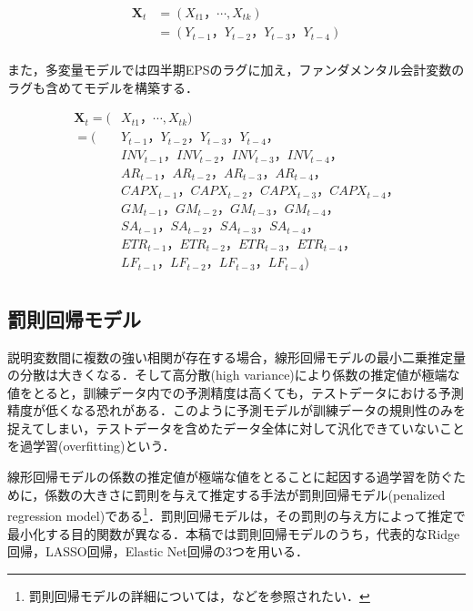 \documentclass[a4paper，12pt]{jsarticle}
\begin{document}
\begin{equation}
  \begin{split}
    \bm{X}_t &= (X_{t1}，\cdots ,X_{tk}) \\
    &= (Y_{t-1}，Y_{t-2}，Y_{t-3}，Y_{t-4}) \\
  \end{split}
\end{equation}

また，多変量モデルでは四半期EPSのラグに加え，ファンダメンタル会計変数のラグも含めてモデルを構築する．

\begin{equation}
  \begin{split}
    \bm{X}_t = (&X_{t1}，\cdots ,X_{tk}) \\ 
    =(&Y_{t-1}，Y_{t-2}，Y_{t-3}，Y_{t-4}，\\
    & INV_{t-1}，INV_{t-2}，INV_{t-3}，INV_{t-4}，\\
    & AR_{t-1}，AR_{t-2}，AR_{t-3}，AR_{t-4}，\\
    & CAPX_{t-1}，CAPX_{t-2}，CAPX_{t-3}，CAPX_{t-4}，\\
    & GM_{t-1}，GM_{t-2}，GM_{t-3}，GM_{t-4}，\\
    & SA_{t-1}，SA_{t-2}，SA_{t-3}，SA_{t-4}，\\
    & ETR_{t-1}，ETR_{t-2}，ETR_{t-3}，ETR_{t-4}，\\ 
    & LF_{t-1}，LF_{t-2}，LF_{t-3}，LF_{t-4}) \\
  \end{split}
\end{equation}

\subsection{罰則回帰モデル}

説明変数間に複数の強い相関が存在する場合，線形回帰モデルの最小二乗推定量の分散は大きくなる．そして高分散(high variance)により係数の推定値が極端な値をとると，訓練データ内での予測精度は高くても，テストデータにおける予測精度が低くなる恐れがある．このように予測モデルが訓練データの規則性のみを捉えてしまい，テストデータを含めたデータ全体に対して汎化できていないことを過学習(overfitting)という．

線形回帰モデルの係数の推定値が極端な値をとることに起因する過学習を防ぐために，係数の大きさに罰則を与えて推定する手法が罰則回帰モデル(penalized regression model)である\footnote{罰則回帰モデルの詳細については，\cite*{hoerl1970ridge, tibshirani1996regression, zou2005regularization}などを参照されたい．}．罰則回帰モデルは，その罰則の与え方によって推定で最小化する目的関数が異なる．本稿では罰則回帰モデルのうち，代表的なRidge回帰，LASSO回帰，Elastic Net回帰の3つを用いる．
\end{document}
